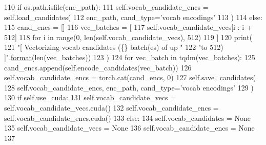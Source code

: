 \begin{DoxyCode}
110                 \textcolor{keywordflow}{if} os.path.isfile(enc\_path):
111                     self.vocab\_candidate\_encs = self.load\_candidates(
112                         enc\_path, cand\_type=\textcolor{stringliteral}{'vocab encodings'}
113                     )
114                 \textcolor{keywordflow}{else}:
115                     cand\_encs = []
116                     vec\_batches = [
117                         self.vocab\_candidate\_vecs[i : i + 512]
118                         \textcolor{keywordflow}{for} i \textcolor{keywordflow}{in} range(0, len(self.vocab\_candidate\_vecs), 512)
119                     ]
120                     print(
121                         \textcolor{stringliteral}{"[ Vectorizing vocab candidates (\{\} batch(es) of up "}
122                         \textcolor{stringliteral}{"to 512) ]"}.\hyperlink{namespaceparlai_1_1chat__service_1_1services_1_1messenger_1_1shared__utils_a32e2e2022b824fbaf80c747160b52a76}{format}(len(vec\_batches))
123                     )
124                     \textcolor{keywordflow}{for} vec\_batch \textcolor{keywordflow}{in} tqdm(vec\_batches):
125                         cand\_encs.append(self.encode\_candidates(vec\_batch))
126                     self.vocab\_candidate\_encs = torch.cat(cand\_encs, 0)
127                     self.save\_candidates(
128                         self.vocab\_candidate\_encs, enc\_path, cand\_type=\textcolor{stringliteral}{'vocab encodings'}
129                     )
130                 \textcolor{keywordflow}{if} self.use\_cuda:
131                     self.vocab\_candidate\_vecs = self.vocab\_candidate\_vecs.cuda()
132                     self.vocab\_candidate\_encs = self.vocab\_candidate\_encs.cuda()
133             \textcolor{keywordflow}{else}:
134                 self.vocab\_candidates = \textcolor{keywordtype}{None}
135                 self.vocab\_candidate\_vecs = \textcolor{keywordtype}{None}
136                 self.vocab\_candidate\_encs = \textcolor{keywordtype}{None}
137 
\end{DoxyCode}
\mbox{\label{classparlai_1_1agents_1_1bert__ranker_1_1bi__encoder__ranker_1_1BiEncoderRankerAgent_afbc986c30ae8857d8d4e505a1884b280}} 
